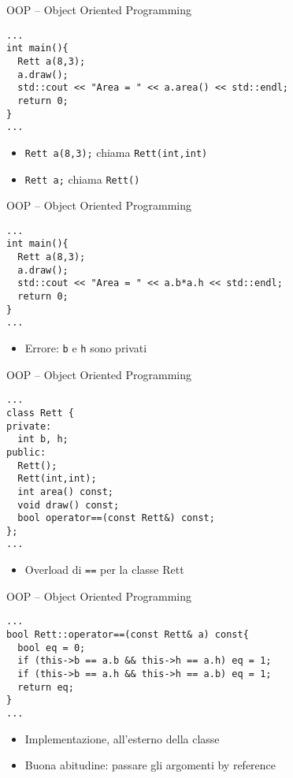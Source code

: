\begin{frame}[fragile]{OOP -- Object Oriented Programming}
  \vfill
  \begin{lstlisting}[firstnumber=10]
...
int main(){
  Rett a(8,3);
  a.draw();
  std::cout << "Area = " << a.area() << std::endl;
  return 0;
}
...\end{lstlisting}
  \vfill
  \begin{itemize}
    \item \lstinline$Rett a(8,3);$ chiama \lstinline$Rett(int,int)$
    \item \lstinline$Rett a;$ chiama \lstinline$Rett()$
  \end{itemize}
  \vfill
\end{frame}

\begin{frame}[fragile]{OOP -- Object Oriented Programming}
  \vfill
  \begin{lstlisting}[firstnumber=10]
...
int main(){
  Rett a(8,3);
  a.draw();
  std::cout << "Area = " << a.b*a.h << std::endl;
  return 0;
}
...\end{lstlisting}
  \vfill
  \begin{itemize}
    \item Errore: \lstinline$b$ e \lstinline$h$ sono privati
  \end{itemize}
  \vfill
\end{frame}

\begin{frame}[fragile]{OOP -- Object Oriented Programming}
  \vfill
  \begin{lstlisting}[firstnumber=2]
...
class Rett {
private:
  int b, h;
public:
  Rett();
  Rett(int,int);
  int area() const;
  void draw() const;
  bool operator==(const Rett&) const;
};
...\end{lstlisting}
  \vfill
  \begin{itemize}
    \item Overload di \lstinline$==$ per la classe Rett
  \end{itemize}
  \vfill
\end{frame}

\begin{frame}[fragile]{OOP -- Object Oriented Programming}
  \vfill
  \begin{lstlisting}[firstnumber=37]
...
bool Rett::operator==(const Rett& a) const{
  bool eq = 0;
  if (this->b == a.b && this->h == a.h) eq = 1;
  if (this->b == a.h && this->h == a.b) eq = 1;
  return eq;
}
...\end{lstlisting}
  \vfill
  \begin{itemize}
    \item Implementazione, all'esterno della classe
    \vfill
    \item Buona abitudine: passare gli argomenti by reference
  \end{itemize}
  \vfill
\end{frame}


